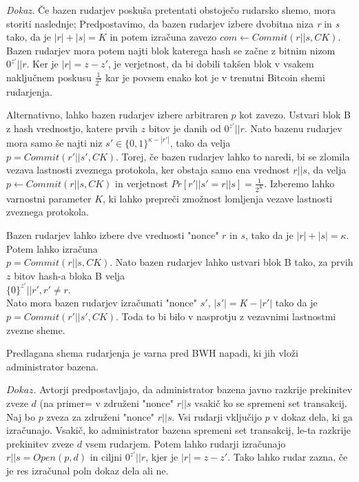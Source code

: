 \documentclass{acm_proc_article-sp}
\begin{document}
\noindent \textit{Dokaz.} Če bazen rudarjev poskuša pretentati obstoječo rudarsko shemo, mora storiti naslednje; Predpostavimo, da bazen rudarjev izbere dvobitna niza \textit{r} in \textit{s} tako, da je \textit{$|r| + |s| = K$} in potem izračuna zavezo \textit{$com \leftarrow Commit(r||s, CK)$}. Bazen rudarjev mora potem najti blok katerega hash se začne z bitnim nizom \textit{$0^{z'}||r$}. Ker je \textit{$|r| = z - z'$}, je verjetnost, da bi dobili takšen blok v vsakem naključnem poskusu $\frac{1}{2^{z}}$ kar je povsem enako kot je v trenutni Bitcoin shemi rudarjenja. 

Alternativno, lahko bazen rudarjev izbere arbitraren \textit{$p$} kot zavezo. Ustvari blok B z hash vrednostjo, katere prvih \textit{$z$} bitov je danih od \textit{$0^{z'}||r$}. Nato bazenu rudarjev mora samo še najti niz  \textit{$s' \in \{0, 1\}^{\kappa-|r'|}$}, tako da velja \\ \textit{$p = Commit(r'||s',CK)$}. Torej, če bazen rudarjev lahko to naredi, bi se zlomila vezava lastnosti zveznega protokola, ker obstaja samo ena vrednost \textit{$r||s$}, da velja \textit{$p \leftarrow Commit(r||s, CK)$} in verjetnost \textit{$Pr [r'||s' = r||s] = \frac{1}{2^{K}}$}. Izberemo lahko varnostni parameter \textit{$K$}, ki lahko prepreči zmožnost lomljenja vezave lastnosti zveznega protokola.

Bazen rudarjev lahko izbere dve vrednosti "nonce" \textit{$r$} in \textit{$s$}, tako da je \textit{$|r| + |s| = \kappa$}. Potem lahko izračuna \\ \textit{$p = Commit(r||s,CK)$}. Nato bazen rudarjev lahko ustvari blok B tako, za  prvih \textit{$z$} bitov hash-a bloka B velja \\ \textit{$\{0\}^{z'}||r',r' \neq r$}.\\ Nato mora bazen rudarjev izračunati "nonce" \textit{$s'$}, \textit{$|s'| = K - |r'|$} tako da je \textit{$p = Commit(r'||s',CK)$}. Toda to bi bilo v nasprotju z vezavnimi lastnostmi zvezne sheme.

\begin{lema}\label{lema4}
	Predlagana shema rudarjenja je varna pred BWH napadi, ki jih vloži administrator bazena.
\end{lema}

\noindent\textit{$Dokaz$}. Avtorji predpostavljajo, da administrator bazena javno razkrije prekinitev zveze \textit{$d$} (na primer= v združeni "nonce" \textit{$r||s$} vsakič ko se spremeni set transakcij. Naj bo \textit{$p$} zveza za združeni "nonce" \textit{$r||s$}. Vsi rudarji vključijo \textit{$p$} v dokaz dela, ki ga izračunajo. Vsakič, ko administrator bazena spremeni set transakcij, le-ta razkrije prekinitev zveze \textit{$d$} vsem rudarjem. Potem lahko rudarji izračunajo \textit{$r||s = Open(p,d)$} in ciljni \textit{$0^{z'}||r$}, kjer je \textit{$|r| = z -z'$}. Tako lahko rudar zazna, če je res izračunal poln dokaz dela ali ne.
\end{document}
